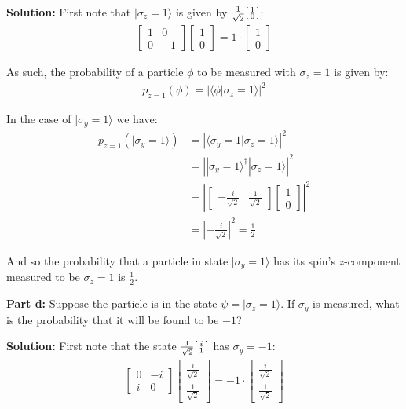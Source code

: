 \documentclass{article}
\newcommand{\icol}[1]{%
  \begin{bsmallmatrix}#1\end{bsmallmatrix}%
}
\begin{document}
\noindent\textbf{Solution:} First note that $|\sigma_z=1\rangle$ is given by $\frac{1}{\sqrt{2}}\icol{1\\0}$:
\begin{align*}
    \begin{bmatrix}
        1&0\\0&-1
    \end{bmatrix}\begin{bmatrix}
        1\\0
    \end{bmatrix}=1\cdot\begin{bmatrix}
        1\\0
    \end{bmatrix}
\end{align*} 

As such, the probability of a particle $\phi$ to be measured with $\sigma_z=1$ is given by:
\begin{align*}
    p_{z=1}(\phi)=\left|\langle\phi|\sigma_z=1\rangle\right|^2
\end{align*}

In the case of $|\sigma_y=1\rangle$ we have:
\begin{align*}
    p_{z=1}(|\sigma_y=1\rangle)&=\left|\langle\sigma_y=1|\sigma_z=1\rangle\right|^2\\
    &=\left||\sigma_y=1\rangle^\dagger|\sigma_z=1\rangle\right|^2\\
    &=\left|\begin{bmatrix}
        -\frac{i}{\sqrt{2}}&\frac{1}{\sqrt{2}}
    \end{bmatrix}\begin{bmatrix}
        1\\0
    \end{bmatrix}\right|^2\\
    &=\left|-\frac{i}{\sqrt{2}}\right|^2=\frac{1}{2}
\end{align*}

And so the probability that a particle in state $|\sigma_y=1\rangle$ has its spin's $z$-component measured to be $\sigma_z=1$ is $\frac{1}{2}$.
\bigskip

\noindent\textbf{Part d:} Suppose the particle is in the state $\psi=|\sigma_z=1\rangle$. If $\sigma_y$ is measured, what is the probability that it will be found to be $-1$?
\bigskip

\noindent\textbf{Solution:} First note that the state $\frac{1}{\sqrt{2}}\icol{i\\1}$ has $\sigma_y=-1$:
\begin{align*}
    \begin{bmatrix}
        0&-i\\i&0
    \end{bmatrix}\begin{bmatrix}
        \frac{i}{\sqrt{2}}\\\frac{1}{\sqrt{2}}
    \end{bmatrix}=-1\cdot\begin{bmatrix}
        \frac{i}{\sqrt{2}}\\\frac{1}{\sqrt{2}}
    \end{bmatrix}
\end{align*} 
\end{document}
